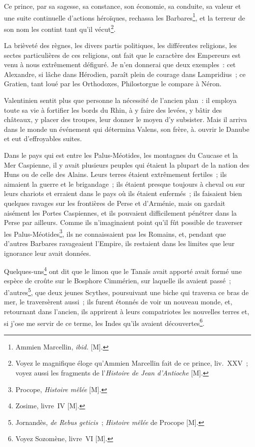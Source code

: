 \documentclass[french,twoside]{book} %
\begin{document}
Ce prince, par sa sagesse, sa constance, son économie, sa conduite, sa valeur et une suite continuelle d’actions héroïques, rechassa les Barbares\footnote{Ammien Marcellin, {\itshape ibid.} [M].}, et la terreur de son nom les contint tant qu’il vécut\footnote{Voyez le magnifique éloge qu’Ammien Marcellin fait de ce prince, liv. XXV ; voyez aussi les fragments de l’{\itshape Histoire de Jean d’Antioche} [M].}.\par
La brièveté des règnes, les divers partis politiques, les différentes religions, les sectes particulières de ces religions, ont fait que le caractère des Empereurs est venu à nous extrêmement défiguré. Je n’en donnerai que deux exemples : cet Alexandre, si lâche dans Hérodien, paraît plein de courage dans Lampridius ; ce Gratien, tant loué par les Orthodoxes, Philostorgue le compare à Néron.\par
Valentinien sentit plus que personne la nécessité de l’ancien plan : il employa toute sa vie à fortifier les bords du Rhin, à y faire des levées, y bâtir des châteaux, y placer des troupes, leur donner le moyen d’y subsister. Mais il arriva dans le monde un événement qui détermina Valens, son frère, à. ouvrir le Danube et eut d’effroyables suites.\par
Dans le pays qui est entre les Palus-Méotides, les montagnes du Caucase et la Mer Caspienne, il y avait plusieurs peuples qui étaient la plupart de la nation des Huns ou de celle des Alains. Leurs terres étaient extrêmement fertiles ; ils aimaient la guerre et le brigandage ; ils étaient presque toujours à cheval ou sur leurs chariots et erraient dans le pays où ils étaient enfermés ; ils faisaient bien quelques ravages sur les frontières de Perse et d’Arménie, mais on gardait aisément les Portes Caspiennes, et ils pouvaient difficilement pénétrer dans la Perse par ailleurs. Comme ils n’imaginaient point qu’il fût possible de traverser les Palus-Méotides\footnote{Procope, {\itshape Histoire mêlée} [M].}, ils ne connaissaient pas les Romains, et, pendant que d’autres Barbares ravageaient l’Empire, ils restaient dans les limites que leur ignorance leur avait données.\par
Quelques-uns\footnote{Zosime, livre IV [M].} ont dit que le limon que le Tanaïs avait apporté avait formé une espèce de croûte sur le Bosphore Cimmérien, sur laquelle ils avaient passé ; d’autres\footnote{Jornandès, {\itshape de Rebus geticis} ; {\itshape Histoire mêlée} de Procope [M].}, que deux jeunes Scythes, poursuivant une biche qui traversa ce bras de mer, le traversèrent aussi ; ils furent étonnés de voir un nouveau monde, et, retournant dans l’ancien, ils apprirent à leurs compatriotes les nouvelles terres et, si j’ose me servir de ce terme, les Indes qu’ils avaient découvertes\footnote{Voyez Sozomène, livre VI [M].}.\par
\end{document}
